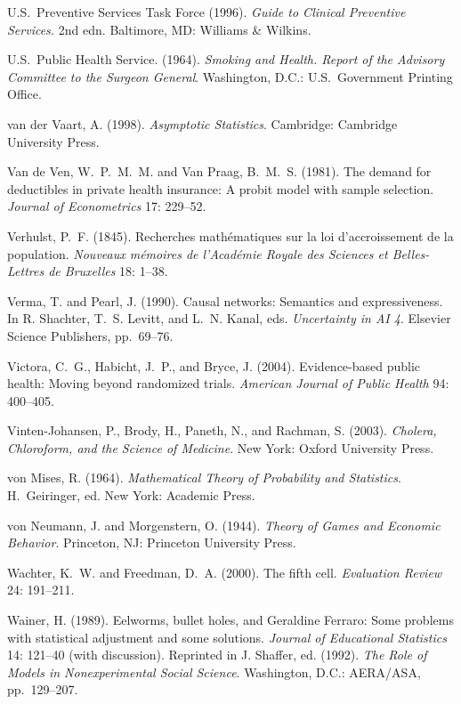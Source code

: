 \smallskip\noindent
U.S.~Preventive Services Task Force (1996).
{\it Guide to Clinical Preventive Services.\/} 2nd edn.
Baltimore, MD: Williams \& Wilkins.

\smallskip\noindent
U.S.~Public Health Service. (1964).
{\it Smoking and Health. Report of the Advisory Committee to the Surgeon General\/}.
Washington, D.C.: U.S.~Government Printing Office.

\smallskip\noindent
van der Vaart, A. (1998).
{\it Asymptotic Statistics\/}.
Cambridge: Cambridge University Press.

\smallskip\noindent
Van de Ven, W.~P.~M.~M. and Van Praag, B.~M.~S. (1981).
The demand for deductibles in private health insurance:
A probit model with sample selection.
{\it Journal of Econometrics\/} 17: 229--52.

\smallskip\noindent
Verhulst, P.~F. (1845).  %
Recherches math\'ematiques sur la loi d'accroisse\-ment de la population.
{\it Nouveaux m\'emoires de l'Acad\'emie Royale des Sciences et Belles-Lettres de Bruxelles\/} {18}: 1--38.

\smallskip\noindent
Verma, T. and Pearl, J. (1990).
Causal networks:  Semantics and expressiveness.
In R. Shachter, T.~S. Levitt, and L.~N. Kanal, eds.
{\it Uncertainty in AI 4\/}.
Elsevier Science Publishers, pp.~69--76.

\smallskip\noindent
Victora, C.~G., Habicht, J.~P., and Bryce, J. (2004).
Evidence-based public health: Moving beyond randomized trials.
{\it American Journal of Public Health\/} 94: 400--405.

\smallskip\noindent
Vinten-Johansen, P., Brody, H., Paneth, N., and Rachman, S. (2003).
{\it Chol\-era, Chloroform, and the Science of Medicine\/}.
New York: Oxford University Press.

\smallskip\noindent
von Mises, R. (1964).
{\it  Mathematical Theory of Probability and Statistics\/}.
H.~Geiringer, ed.
New York: Academic Press.

\smallskip\noindent
von Neumann, J. and Morgenstern, O. (1944).
{\it Theory of Games and Economic Behavior\/}.
Princeton, NJ: Princeton University Press.

\smallskip\noindent
Wachter, K.~W. and Freedman, D.~A. (2000).
The fifth cell.
{\it Evaluation Review\/} 24: 191--211.

\smallskip\noindent
Wainer, H. (1989).
Eelworms, bullet holes, and Geraldine Ferraro:
Some problems with statistical adjustment and some solutions.
{\it Journal of Educational Statistics\/} 14: 121--40 (with discussion).
Reprinted in J. Shaffer, ed. (1992).
{\it The Role of Models in Nonexperimental Social Science\/}.
Washington, D.C.: AERA/ASA, pp.~129--207.

